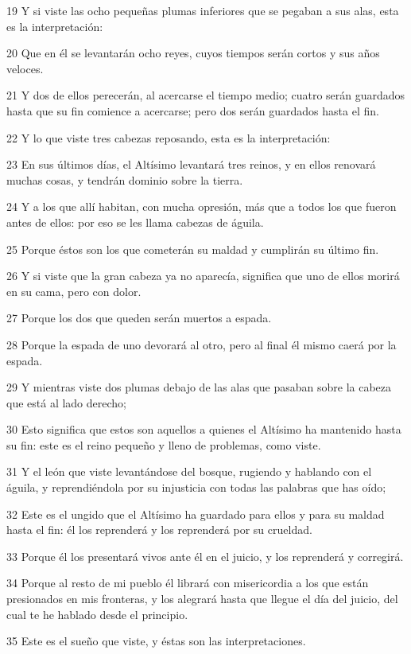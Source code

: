 \par 19 Y si viste las ocho pequeñas plumas inferiores que se pegaban a sus alas, esta es la interpretación:
\par 20 Que en él se levantarán ocho reyes, cuyos tiempos serán cortos y sus años veloces.
\par 21 Y dos de ellos perecerán, al acercarse el tiempo medio; cuatro serán guardados hasta que su fin comience a acercarse; pero dos serán guardados hasta el fin.
\par 22 Y lo que viste tres cabezas reposando, esta es la interpretación:
\par 23 En sus últimos días, el Altísimo levantará tres reinos, y en ellos renovará muchas cosas, y tendrán dominio sobre la tierra.
\par 24 Y a los que allí habitan, con mucha opresión, más que a todos los que fueron antes de ellos: por eso se les llama cabezas de águila.
\par 25 Porque éstos son los que cometerán su maldad y cumplirán su último fin.
\par 26 Y si viste que la gran cabeza ya no aparecía, significa que uno de ellos morirá en su cama, pero con dolor.
\par 27 Porque los dos que queden serán muertos a espada.
\par 28 Porque la espada de uno devorará al otro, pero al final él mismo caerá por la espada.
\par 29 Y mientras viste dos plumas debajo de las alas que pasaban sobre la cabeza que está al lado derecho;
\par 30 Esto significa que estos son aquellos a quienes el Altísimo ha mantenido hasta su fin: este es el reino pequeño y lleno de problemas, como viste.
\par 31 Y el león que viste levantándose del bosque, rugiendo y hablando con el águila, y reprendiéndola por su injusticia con todas las palabras que has oído;
\par 32 Este es el ungido que el Altísimo ha guardado para ellos y para su maldad hasta el fin: él los reprenderá y los reprenderá por su crueldad.
\par 33 Porque él los presentará vivos ante él en el juicio, y los reprenderá y corregirá.
\par 34 Porque al resto de mi pueblo él librará con misericordia a los que están presionados en mis fronteras, y los alegrará hasta que llegue el día del juicio, del cual te he hablado desde el principio.
\par 35 Este es el sueño que viste, y éstas son las interpretaciones.
